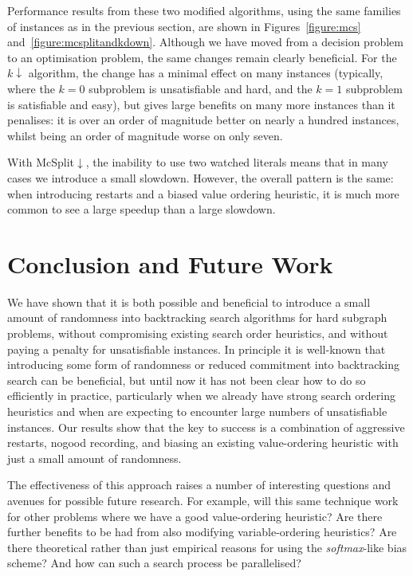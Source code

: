 \documentclass[a4paper,UKenglish]{lipics-v2018}
\newcommand{\twofigureref}[2]{Figures~\ref{#1} and~\ref{#2}}
\begin{document}
Performance results from these two modified algorithms, using the same families of instances as in
the previous section, are shown in \twofigureref{figure:mcs}{figure:mcsplitandkdown}. Although we have
moved from a decision problem to an optimisation problem, the same changes remain clearly
beneficial. For the $k{\downarrow}$ algorithm, the change has a minimal effect on many instances
(typically, where the $k = 0$ subproblem is unsatisfiable and hard, and the $k = 1$ subproblem is
satisfiable and easy), but gives large benefits on many more instances than it penalises: it is over
an order of magnitude better on nearly a hundred instances, whilst being an order of magnitude worse
on only seven.

With McSplit${\downarrow}$, the inability to use two watched literals means that in many cases we
introduce a small slowdown. However, the overall pattern is the same: when introducing restarts and
a biased value ordering heuristic, it is much more common to see a large speedup than a large
slowdown.

\section{Conclusion and Future Work}

We have shown that it is both possible and beneficial to introduce a small amount of randomness into
backtracking search algorithms for hard subgraph problems, without compromising existing search
order heuristics, and without paying a penalty for unsatisfiable instances. In principle it is
well-known that introducing some form of randomness \cite{DBLP:conf/aaai/GomesSK98} or reduced
commitment \cite{DBLP:conf/ijcai/HarveyG95} into backtracking search can be beneficial, but until
now it has not been clear how to do so efficiently in practice, particularly when we already have
strong search ordering heuristics and when are expecting to encounter large numbers of unsatisfiable
instances. Our results show that the key to success is a combination of aggressive restarts, nogood
recording, and biasing an existing value-ordering heuristic with just a small amount of randomness.

The effectiveness of this approach raises a number of interesting questions and avenues for possible
future research. For example, will this same technique work for other problems where we have a good
value-ordering heuristic? Are there further benefits to be had from also modifying variable-ordering
heuristics? Are there theoretical rather than just empirical reasons for using the
\emph{softmax}-like bias scheme? And how can such a search process be parallelised?


\end{document}
